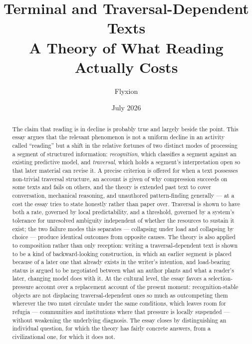 \documentclass[11pt]{article}
\title{\textbf{Terminal and Traversal-Dependent Texts}\\
\large A Theory of What Reading Actually Costs}
\author{Flyxion}
\date{July 2026}
\begin{document}
\maketitle

\begin{abstract}
\noindent The claim that reading is in decline is probably true and largely beside the point. This essay argues that the relevant phenomenon is not a uniform decline in an activity called ``reading'' but a shift in the relative fortunes of two distinct modes of processing a segment of structured information: \emph{recognition}, which classifies a segment against an existing predictive model, and \emph{traversal}, which holds a segment's interpretation open so that later material can revise it. A precise criterion is offered for when a text possesses non-trivial traversal structure, an account is given of why compression succeeds on some texts and fails on others, and the theory is extended past text to cover conversation, mechanical reasoning, and unauthored pattern-finding generally --- at a cost the essay tries to state honestly rather than paper over. Traversal is shown to have both a rate, governed by local predictability, and a threshold, governed by a system's tolerance for unresolved ambiguity independent of whether the resources to sustain it exist; the two failure modes this separates --- collapsing under load and collapsing by choice --- produce identical outcomes from opposite causes. The theory is also applied to composition rather than only reception: writing a traversal-dependent text is shown to be a kind of backward-looking construction, in which an earlier segment is placed because of a later one that already exists in the writer's intention, and load-bearing status is argued to be negotiated between what an author plants and what a reader's later, changing model does with it. At the cultural level, the essay favors a selection-pressure account over a replacement account of the present moment: recognition-stable objects are not displacing traversal-dependent ones so much as outcompeting them wherever the two must circulate under the same conditions, which leaves room for refugia --- communities and institutions where that pressure is locally suspended --- without weakening the underlying diagnosis. The essay closes by distinguishing an individual question, for which the theory has fairly concrete answers, from a civilizational one, for which it does not.
\end{abstract}
\end{document}
